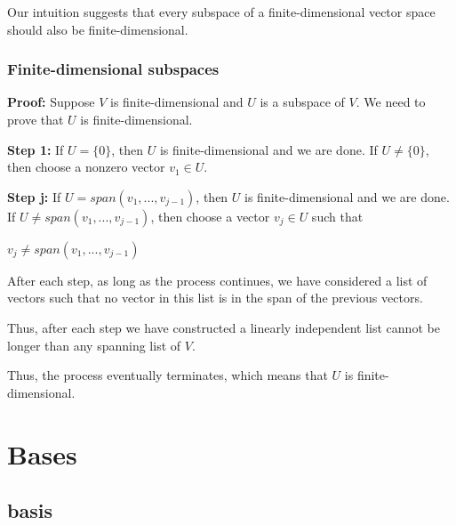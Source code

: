 \documentclass{report}
\begin{document}
Our intuition suggests that every subspace of a finite-dimensional vector space should also be finite-dimensional.

\subsubsection{Finite-dimensional subspaces}

\textbf{Proof:}\newline
Suppose $V$ is finite-dimensional and $U$ is a subspace of $V$. We need to prove that $U$ is finite-dimensional. 

\textbf{Step 1:}\newline
If $U = \{0\}$, then $U$ is finite-dimensional and we are done. If $U \neq \{0\}$, then choose a nonzero vector $v_1 \in U$.

\textbf{Step j:}\newline
If $U = span(v_1,...,v_{j-1})$, then $U$ is finite-dimensional and we are done. If $U \neq span(v_1,...,v_{j-1})$, then choose a vector $v_j \in U$ such that\newline
   \centerline{$v_j \neq span(v_1,...,v_{j-1})$} 

After each step, as long as the process continues, we have considered a list of vectors such that no vector in this list is in the span of the previous vectors.\newline

Thus, after each step we have constructed a linearly independent list cannot be longer than any spanning list of $V$. \newline

Thus, the process eventually terminates, which means that $U$ is finite-dimensional.

\section{Bases}
\subsection{basis}
\end{document}
